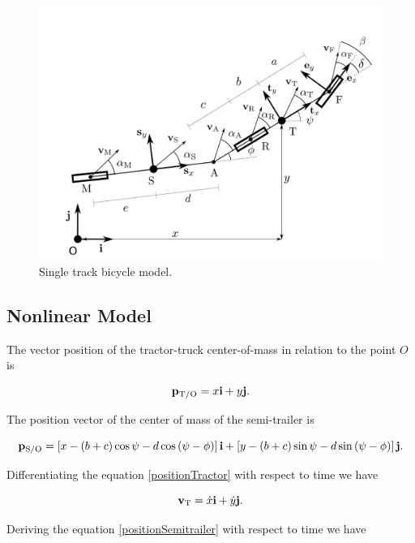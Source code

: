 \documentclass[sublist,a4paper,twoside,11pt]{article}
\begin{document}
\begin{figure}[h]
	\centering
	\includegraphics[width=0.7\linewidth]{figures/SingeTrackBicycleModel}
    \caption{Single track bicycle model.}	\label{fig:singetrackbicyclemodel}
\end{figure}



\subsection{Nonlinear Model}

The vector position of the tractor-truck center-of-mass in relation to the point \(O \) is

\begin{equation} \label{positionTractor}
    {\bf p}_{{\rm T}/{\rm O}} = x {\bf i} + y {\bf j}.
\end{equation}

The position vector of the center of mass of the semi-trailer is

\begin{equation} \label{positionSemitrailer}
    {\bf p}_{{\rm S}/{\rm O}} = \left[ x - \left( b + c \right) \cos \psi - d \cos \left( \psi - \phi \right) \right] {\bf i} + \left[ y - \left( b + c \right) \sin \psi - d \sin \left( \psi - \phi \right) \right] {\bf j}.
\end{equation}

Differentiating the equation \eqref {positionTractor} with respect to time we have

\begin{equation} \label{velocityTractor}
    {\bf v}_{\rm T} = \dot{x} {\bf i} + \dot{y} {\bf j}.
\end{equation}

Deriving the equation \eqref {positionSemitrailer} with respect to time we have
\end{document}
